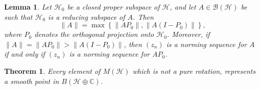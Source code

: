 \documentclass[10pt,a4paper]{amsart}
\newtheorem{theorem}{Theorem}
\newtheorem{lemma}{Lemma}
\newcommand{\B}{\mathcal{B}}
\renewcommand{\H}{\mathcal{H}}
\begin{document}
\begin{lemma}\label{block matrix norm}
Let $\mathcal{H}_0$ be a closed proper subspace of $\mathcal{H}$, and let $A \in \B(\mathcal{H})$ be such that $\mathcal{H}_0$ is a reducing subspace of $A$. Then 
\[
\|A\| = \max\left\{\|AP_0\|, \|A(I-P_0)\|\right\},
\]
where $P_0$ denotes the orthogonal projection onto $\mathcal{H}_0$. Moreover, if $\|A\| = \|AP_0\| > \|A(I-P_0)\|$, then $(z_n)$ is a norming sequence for $A$ if and only if $(z_n)$ is a norming sequence 
for $AP_0$.
\end{lemma}

\begin{theorem}\label{smooth: Aut}
Every element of $M \left(\H \right)$ which is not a pure rotation, represents a smooth point in $B \left(\H\oplus \mathbb{C} \right)$. 
\end{theorem}
\end{document}
